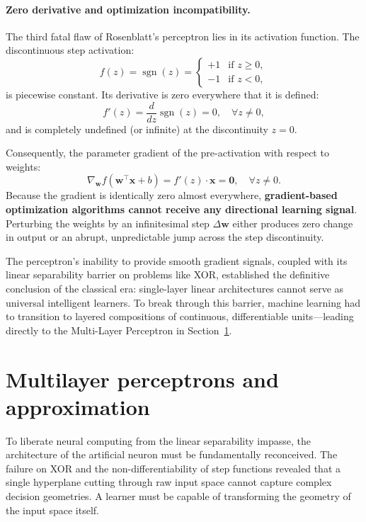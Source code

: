 \paragraph{Zero derivative and optimization incompatibility.}
The third fatal flaw of Rosenblatt's perceptron lies in its activation function. The discontinuous step activation:
\begin{equation}
f(z) = \operatorname{sgn}(z) = \begin{cases} +1 & \text{if } z \ge 0, \\ -1 & \text{if } z < 0, \end{cases}
\end{equation}
is piecewise constant. Its derivative is zero everywhere that it is defined:
\begin{equation}
f'(z) = \frac{d}{dz}\operatorname{sgn}(z) = 0, \quad \forall z \ne 0,
\end{equation}
and is completely undefined (or infinite) at the discontinuity $z = 0$. 

Consequently, the parameter gradient of the pre-activation with respect to weights:
\begin{equation}
\nabla_\mathbf{w} f(\mathbf{w}^\top \mathbf{x} + b) = f'(z) \cdot \mathbf{x} = \mathbf{0}, \quad \forall z \ne 0.
\end{equation}
Because the gradient is identically zero almost everywhere, \textbf{gradient-based optimization algorithms cannot receive any directional learning signal}. Perturbing the weights by an infinitesimal step $\Delta \mathbf{w}$ either produces zero change in output or an abrupt, unpredictable jump across the step discontinuity. 

The perceptron's inability to provide smooth gradient signals, coupled with its linear separability barrier on problems like XOR, established the definitive conclusion of the classical era: single-layer linear architectures cannot serve as universal intelligent learners. To break through this barrier, machine learning had to transition to layered compositions of continuous, differentiable units---leading directly to the Multi-Layer Perceptron in Section~\ref{sec:mlp_and_representation_learning}.

\section{Multilayer perceptrons and approximation}
\label{sec:mlp_and_representation_learning}

To liberate neural computing from the linear separability impasse, the architecture of the artificial neuron must be fundamentally reconceived. The failure on XOR and the non-differentiability of step functions revealed that a single hyperplane cutting through raw input space cannot capture complex decision geometries. A learner must be capable of transforming the geometry of the input space itself.

